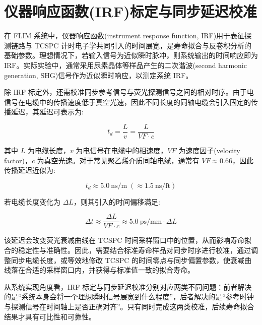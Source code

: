 \section{仪器响应函数(IRF)标定与同步延迟校准}\label{5.2}

在 FLIM 系统中，仪器响应函数(instrument response function, IRF)用于表征探测链路与 TCSPC 计时电子学共同引入的时间展宽，是寿命拟合与反卷积分析的基础参数。理想情况下，若输入信号为近似瞬时脉冲，则系统输出的时间响应即为 IRF。实际实验中，通常采用尿素晶体等样品产生的二次谐波(second harmonic generation, SHG)信号作为近似瞬时响应，以测定系统 IRF。

除 IRF 标定外，还需校准同步参考信号与荧光探测信号之间的相对时序\cite{RN94}。由于电信号在电缆中的传播速度低于真空光速，因此不同长度的同轴电缆会引入固定的传播延迟，其延迟可表示为:

\begin{equation}
  t_d=\frac{L}{v}=\frac{L}{VF\cdot c}
\end{equation}

其中 $L$ 为电缆长度，$v$ 为电信号在电缆中的相速度，$VF$ 为速度因子(velocity factor)，$c$ 为真空光速。对于常见聚乙烯介质同轴电缆，通常有 $VF\approx 0.66$，因此传播延迟近似为:

\begin{equation}
  t_d \approx 5.0~\text{ns/m}\;(\approx 1.5~\text{ns/ft})
\end{equation}

若电缆长度变化为 $\Delta L$，则其引入的时间偏移满足:

\begin{equation}
  \Delta t \approx \frac{\Delta L}{VF\cdot c}\approx 5.0~\text{ps/mm}\cdot \Delta L
\end{equation}

该延迟会改变荧光衰减曲线在 TCSPC 时间采样窗口中的位置，从而影响寿命拟合的稳定性与准确性。因此，需要结合标准寿命样品对同步时序进行校准，通过调整同步电缆长度，或等效地修改 TCSPC 的时间零点与同步偏置参数，使衰减曲线落在合适的采样窗口内，并获得与标准值一致的拟合寿命。

从系统实现角度看，IRF 标定与同步延迟校准分别对应两类不同问题：前者解决的是``系统本身会将一个理想瞬时信号展宽到什么程度''，后者解决的是``参考时钟与探测信号在时间轴上是否正确对齐''。只有同时完成这两类校准，后续寿命拟合结果才具有可比性和可靠性。





